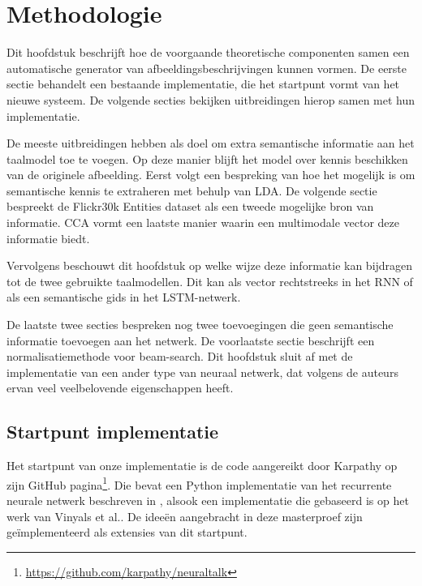 \chapter{Methodologie}

Dit hoofdstuk beschrijft hoe de voorgaande theoretische componenten samen een automatische generator van afbeeldingsbeschrijvingen kunnen vormen. De eerste sectie behandelt een bestaande implementatie, die het startpunt vormt van het nieuwe systeem. De volgende secties bekijken uitbreidingen hierop samen met hun implementatie. 

De meeste uitbreidingen hebben als doel om extra semantische informatie aan het taalmodel toe te voegen. Op deze manier blijft het model over kennis beschikken van de originele afbeelding. Eerst volgt een bespreking van hoe het mogelijk is om semantische kennis te extraheren met behulp van LDA. De volgende sectie bespreekt de Flickr30k Entities dataset als een tweede mogelijke bron van informatie. CCA vormt een laatste manier waarin een multimodale vector deze informatie biedt.

Vervolgens beschouwt dit hoofdstuk op welke wijze deze informatie kan bijdragen tot de twee gebruikte taalmodellen. Dit kan als vector rechtstreeks in het RNN of als een semantische gids in het LSTM-netwerk. 

De laatste twee secties bespreken nog twee toevoegingen die geen semantische informatie toevoegen aan het netwerk. De voorlaatste sectie beschrijft een normalisatiemethode voor beam-search. Dit hoofdstuk sluit af met de implementatie van een ander type van neuraal netwerk, dat volgens de auteurs ervan veel veelbelovende eigenschappen heeft.


\section{Startpunt implementatie} 
Het startpunt van onze implementatie is de code aangereikt door Karpathy op zijn GitHub pagina\footnote{\url{https://github.com/karpathy/neuraltalk}}. Die bevat een Python implementatie van het recurrente neurale netwerk beschreven in \cite{Karpathy2015}, alsook een implementatie die gebaseerd is op het werk van Vinyals et al.\cite{Google}. De idee\"en aangebracht in deze masterproef zijn ge\"implementeerd als extensies van dit startpunt.

